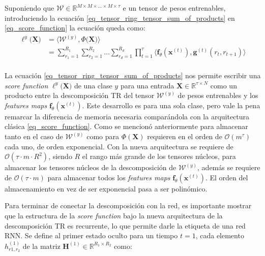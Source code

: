 \documentclass[spanish]{article}
\theoremstyle{definition}
\theoremstyle{remark}
\numberwithin{equation}{section}
\numberwithin{equation}{section} %
\begin{document}
Suponiendo que $\mathcal{W} \in \mathbb{R}^{M \times M \times \ldots \times M \times \tau}$ e  un tensor de pesos entrenables,  introduciendo la ecuación \eqref{eq_tensor_ring_tensor_sum_of_products} en \eqref{eq_score_function} la ecuación queda como:
\begin{equation}
\label{eq_score_function_class_tensor_ring}
\begin{split}
\ell^y\big(\boldsymbol{X}\big) & 
=\Bigg\langle \mathcal{W}^{(y)} , \mathit{\Phi}\Big(\boldsymbol{X}\Big) \Bigg\rangle 
  \\ &
 =\sum^{R_1}_{r_1=1}\sum^{R_2}_{r_2=1}\ldots\sum^{R_d}_{r_d=1}\prod^\tau_{t=1}\langle \boldsymbol{f}_\theta(\boldsymbol{x}^{(t)}),\boldsymbol{g}^{(t)}(r_t,r_{t+1}) \rangle
 \\
\end{split}
\end{equation} \par
La ecuación \eqref{eq_tensor_ring_tensor_sum_of_products} nos permite escribir una \textit{score function} $\ell^y\big(\boldsymbol{X}\big)$ de una clase $y$ para una entrada $\boldsymbol{X} \in \mathbb{R}^{\tau \times N}$ como un producto entre la descomposición TR del tensor $\mathcal{W}^{(y)}$ de pesos entrenables y los \textit{features maps} $\boldsymbol{f}_\theta(\boldsymbol{x}^{(t)})$. Este desarrollo es para una sola clase, pero vale la pena remarcar la diferencia de memoria necesaria comparándola con la arquitectura clásica \eqref{eq_score_function}. Como se mencionó anteriormente para almacenar tanto en el caso de $\mathcal{W}^{(y)}$ como para $\mathit{\Phi}(\boldsymbol{X})$  requieren en el orden de $\mathcal{O}(m^{\tau})$ cada uno, de orden exponencial. Con la nueva arquitectura se requiere de $\mathcal{O}(\tau \cdot m \cdot R^2)$, siendo $R$ el rango más grande de los tensores núcleos, para almacenar los tensores núcleos de la descomposición de $\mathcal{W}^{(y)}$, además se requiere de $\mathcal{O}(\tau \cdot m)$ para almacenar todos los \textit{features maps} $\boldsymbol{f}_\theta(\boldsymbol{x}^{(t)})$. El orden del almacenamiento en vez de ser exponencial pasa a ser polinómico.  
\par
Para terminar de conectar la descomposición con la red, es importante mostrar que la estructura de la \textit{score function} bajo la nueva arquitectura de la descomposición TR es recurrente, lo que permite darle la etiqueta de una red RNN. Se define al primer estado oculto para un tiempo $t=1$, cada elemento $h^{(1)}_{r1,r_2}$ de la matriz $\boldsymbol{H}^{(1)} \in \mathbb{R}^{R_1 \times R_2}$ como:
\end{document}
